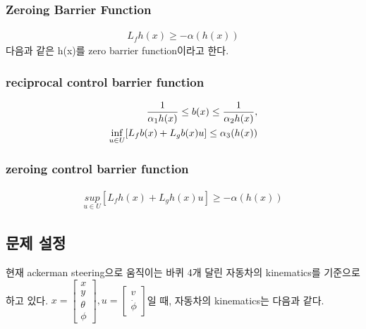\documentclass[journal]{IEEEtran}
\begin{document}
\subsubsection{Zeroing Barrier Function}
\begin{align}
	L_fh(x)\geq-\alpha(h(x))	
	\label{eq:zero_barrier_function}
\end{align}
다음과 같은 h(x)를 zero barrier function이라고 한다. 

\subsubsection{reciprocal control barrier function}
\begin{align}
	{1 \over{\alpha_1h(x)}}\leq b(x)\leq{{1 \over{\alpha_2h(x)}}},\nonumber\\
	\underset{u\in U}{\inf}[L_fb(x)+L_gb(x)u]\leq \alpha_3(h(x))
\end{align}

\subsubsection{zeroing control barrier function }
\begin{align}
	\underset{u\in U}{sup}[L_fh(x)+L_gh(x)u]\geq -\alpha(h(x))
\end{align}


\subsection{문제 설정}
현재 ackerman steering으로 움직이는 바퀴 4개 달린 자동차의 kinematics를 기준으로 하고 있다. 
$x=\begin{bmatrix*} x\\y\\\theta\\\phi \end{bmatrix*},u=\begin{bmatrix*}v\\\dot{\phi} \end{bmatrix*}$일 때,
자동차의 kinematics는 다음과 같다.
\end{document}
